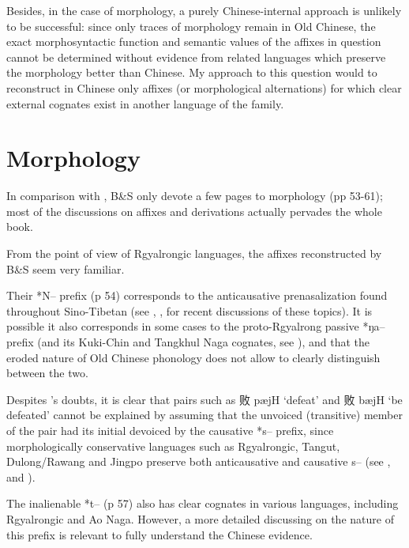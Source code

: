 \documentclass[oldfontcommands,oneside,a4paper,11pt]{article}
\newcommand{\ipa}[1]{{\phon #1}} %
\newcommand{\zh}[1]{{\cn #1}}
\begin{document}
Besides, in the case of morphology, a purely Chinese-internal approach is unlikely to be successful: since only traces of morphology remain in Old Chinese, the exact morphosyntactic function and semantic values of the affixes in question cannot be determined without evidence from related languages which preserve the morphology better than Chinese. My approach to this question would to reconstruct in Chinese only affixes (or morphological alternations) for which clear external cognates exist in another language of the family. 

\section{Morphology}
In comparison with \citet{sagart99roc}, B\&S only devote a few pages to morphology (pp 53-61); most of the discussions on affixes and derivations  actually pervades the whole book. 

From the point of view of Rgyalrongic languages, the affixes reconstructed by B\&S seem very familiar. 


Their *N-- prefix (p 54) corresponds to the anticausative prenasalization found throughout Sino-Tibetan (see \citealt{jacques12internal}, \citealt{sagart12sprefix}, \citealt{hill14voicing} for recent discussions of these topics). It is possible it also corresponds in some cases to the proto-Rgyalrong passive *\ipa{ŋa--} prefix (and its Kuki-Chin and Tangkhul Naga cognates, see \citealt{jacques07passif}), and that the eroded nature of Old Chinese phonology does not allow to clearly distinguish between the two.

Despites \citet{mei12caus}'s doubts, it is clear that pairs such as \zh{败} \ipa{pæjH} `defeat' and \zh{败} \ipa{bæjH} `be defeated' cannot be explained by assuming that the unvoiced (transitive) member of the pair had its initial devoiced by the causative *\ipa{s--} prefix, since morphologically conservative languages such as Rgyalrongic, Tangut, Dulong/Rawang and Jingpo preserve both anticausative and causative \ipa{s--} (see \citealt{lai14caus}, \citealt{jacques12demotion} and \citealt{lapolla03}). 

The inalienable *t-- (p 57) also has clear cognates in various languages, including Rgyalrongic and Ao Naga. However, a more detailed discussing on the nature of this prefix is relevant to fully understand the Chinese evidence. 
\end{document}
